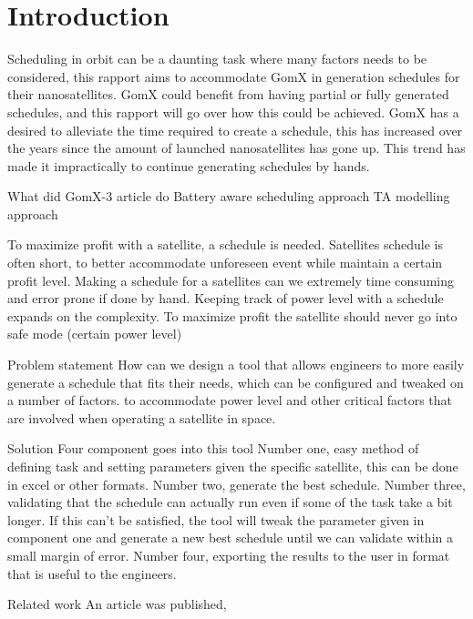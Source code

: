 \chapter{Introduction}\label{cha:intro}
Scheduling in orbit can be a daunting task where many factors needs to be considered, this rapport aims to accommodate GomX in generation schedules for their nanosatellites. GomX could benefit from having partial or fully generated schedules, and this rapport will go over how this could be achieved. GomX has a desired to alleviate the time required to create a schedule, this has increased over the years since the amount of launched nanosatellites has gone up. This trend has made it impractically to continue generating schedules by hands.


What did GomX-3 article do
	Battery aware scheduling approach
		TA modelling approach

To maximize profit with a satellite, a schedule is needed.
	Satellites schedule is often short, to better accommodate unforeseen event while maintain a certain profit level.
	Making a schedule for a satellites can we extremely time consuming and error prone if done by hand.
	Keeping track of power level with a schedule expands on the complexity.
	To maximize profit the satellite should never go into safe mode (certain power level)
	
Problem statement
	How can we design a tool that allows engineers to more easily generate a schedule that fits their needs, which can be configured and tweaked on a number of factors. to accommodate power level and other critical factors that are involved when operating a satellite in space.

Solution
	Four component goes into this tool
	Number one, easy method of defining task and setting parameters given the specific satellite, this can be done in excel or other formats.
	Number two, generate the best schedule.
	Number three, validating that the schedule can actually run even if some of the task take a bit longer. If this can't be satisfied, the tool will tweak the parameter given in component one and generate a new best schedule until we can validate within a small margin of error.
	Number four, exporting the results to the user in format that is useful to the engineers.


Related work
An article was published, 

